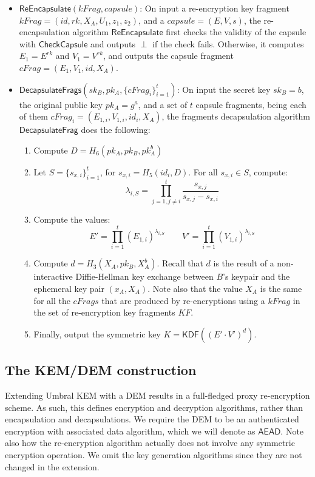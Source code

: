 \documentclass{amsart}
\begin{document}
\begin{itemize}
\item $\mathsf{ReEncapsulate}(kFrag, capsule)$: On input a re-encryption key fragment $kFrag= (id, rk, X_A, U_1, z_1, z_2)$, and a $capsule = (E,V,s)$, the re-encapsulation algorithm $\mathsf{ReEncapsulate}$ first checks the validity of the capsule with $\mathsf{CheckCapsule}$ and outputs $\perp$ if the check fails. Otherwise, it computes $E_1 = E^{rk}$ and $V_1 = V^{rk}$, and outputs the capsule fragment $cFrag = (E_1, V_1, id, X_A)$. 

\item $\mathsf{DecapsulateFrags}(sk_B, pk_A, \{cFrag_i\}_{i=1}^t)$: On input the secret key $sk_B = b$, the original public key $pk_A = g^a$, and a set of $t$ capsule fragments, being each of them $cFrag_i = (E_{1,i}, V_{1,i}, id_i, X_A)$, the fragments decapsulation algorithm $\mathsf{DecapsulateFrag}$ does the following:
	
	\begin{enumerate}
	\item Compute $ D = H_6(pk_A, pk_B, pk_A^b)$
    \item Let $S = \{s_{x,i}\}_{i=1}^t$, for $s_{x,i} = H_5(id_i, D)$. For all $s_{x,i}\in S$, compute:
    \[\lambda_{i, S} = \prod\limits_{j=1, j\neq i}^{t} \frac{s_{x,j}}{s_{x,j}-s_{x,i}}\]
    \item Compute the values:
     	$$E' = \prod\limits_{i=1}^{t} (E_{1,i})^{\lambda_{i, S}}	
		\qquad
		V' = \prod\limits_{i=1}^{t} (V_{1,i})^{\lambda_{i, S}}$$
	\item Compute $d = H_3(X_A, pk_B, X_A^b)$. Recall that $d$ is the result of a non-interactive Diffie-Hellman key exchange between $B$'s keypair and the ephemeral key pair $(x_A, X_A)$. Note also that the value $X_A$ is the same for all the $cFrags$ that are produced by re-encryptions using a $kFrag$ in the set of re-encryption key fragments $KF$. 
	\item Finally, output the symmetric key $K= \mathsf{KDF}((E'\cdot V')^{d})$. 
	\end{enumerate}




\end{itemize}

		

\subsection{The KEM/DEM construction}

Extending Umbral KEM with a DEM results in a full-fledged proxy re-encryption scheme. As such, this defines encryption and decryption algorithms, rather than encapsulation and decapsulations. We require the DEM to be an authenticated encryption with associated data algorithm, which we will denote as $\mathsf{AEAD}$. Note also how the re-encryption algorithm actually does not involve any symmetric encryption operation. We omit the key generation algorithms since they are not changed in the extension. 
\end{document}
